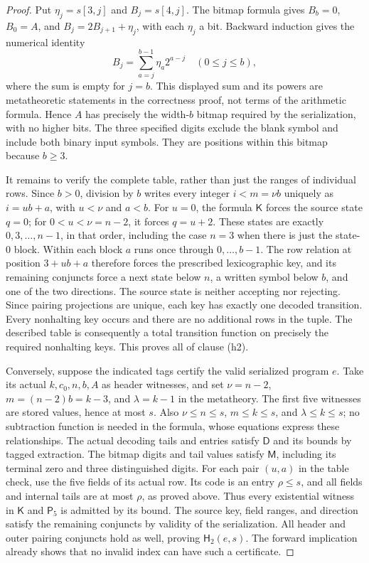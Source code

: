 \begin{proof}
Put \(\eta_j=s[3,j]\) and \(B_j=s[4,j]\).  The bitmap formula
gives \(B_b=0\), \(B_0=A\), and
\(B_j=2B_{j+1}+\eta_j\), with each \(\eta_j\) a bit.
Backward induction gives the numerical identity
\[
 B_j=\sum_{a=j}^{b-1}\eta_a2^{a-j}\quad(0\leq j\leq b),
\]
where the sum is empty for \(j=b\).  This displayed sum and its
powers are metatheoretic statements in the correctness proof, not
terms of the arithmetic formula.  Hence \(A\) has precisely the
width-\(b\) bitmap required by the serialization, with no higher
bits.  The three specified digits exclude the blank symbol and include
both binary input symbols.  They are positions within this bitmap
because \(b\geq3\).

It remains to verify the complete table, rather than just the ranges
of individual rows.  Since \(b>0\), division by \(b\) writes every
integer \(i<m=\nu b\) uniquely as \(i=ub+a\), with
\(u<\nu\) and \(a<b\).  For \(u=0\), the formula \(\mathsf K\)
forces the source state \(q=0\); for \(0<u<\nu=n-2\), it forces
\(q=u+2\).  These states are exactly \(0,3,\ldots,n-1\), in
that order, including the case \(n=3\) when there is just the
state-\(0\) block.  Within each block \(a\) runs once through
\(0,\ldots,b-1\).  The row relation at position \(3+ub+a\)
therefore forces the prescribed lexicographic key, and its remaining
conjuncts force a next state below \(n\), a written symbol below
\(b\), and one of the two directions.  The source state is neither
accepting nor rejecting.  Since pairing projections are unique, each
key has exactly one decoded transition.  Every nonhalting key occurs
and there are no additional rows in the tuple.  The described table
is consequently a total transition function on precisely the required
nonhalting keys.  This proves all of clause (h2).

Conversely, suppose the indicated tags certify the valid serialized
program \(e\).  Take its actual \(k,c_0,n,b,A\) as header
witnesses, and set \(\nu=n-2\), \(m=(n-2)b=k-3\), and
\(\lambda=k-1\) in the metatheory.  The first five witnesses are
stored values, hence at most \(s\).  Also
\(\nu\leq n\leq s\), \(m\leq k\leq s\), and
\(\lambda\leq k\leq s\); no subtraction function is needed in
the formula, whose equations express these relationships.
The actual decoding tails and entries satisfy \(\mathsf D\)
and its bounds by tagged extraction.  The bitmap digits and tail
values satisfy \(\mathsf M\), including its terminal zero and
three distinguished digits.  For each pair \((u,a)\) in the table
check, use the five fields of its actual row.  Its code is an entry
\(\rho\leq s\), and all fields and internal tails are at most
\(\rho\), as proved above.  Thus every existential witness in
\(\mathsf K\) and \(\mathsf P_5\) is admitted by its bound.
The source key, field ranges, and direction satisfy the remaining
conjuncts by validity of the serialization.  All header and outer
pairing conjuncts hold as well, proving \(\mathsf H_2(e,s)\).
The forward implication already shows that no invalid index can
have such a certificate.
\end{proof}

